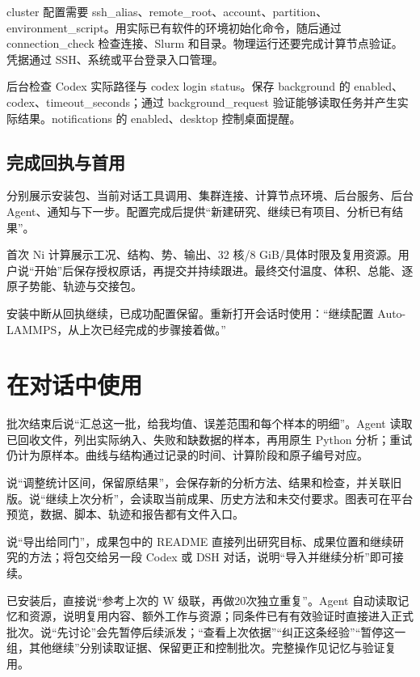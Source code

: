 \documentclass[11pt,a4paper]{ctexart}
\begin{document}
cluster 配置需要 ssh\_\allowbreak{}alias、remote\_\allowbreak{}root、account、partition、environment\_\allowbreak{}script。用实际已有软件的环境初始化命令，随后通过 connection\_\allowbreak{}check 检查连接、Slurm 和目录。物理运行还要完成计算节点验证。凭据通过 SSH、系统或平台登录入口管理。



后台检查 Codex 实际路径与 codex login status。保存 background 的 enabled、codex、timeout\_\allowbreak{}seconds；通过 background\_\allowbreak{}request 验证能够读取任务并产生实际结果。notifications 的 enabled、desktop 控制桌面提醒。



\subsection{完成回执与首用}


分别展示安装包、当前对话工具调用、集群连接、计算节点环境、后台服务、后台 Agent、通知与下一步。配置完成后提供“新建研究、继续已有项目、分析已有结果”。



首次 Ni 计算展示工况、结构、势、输出、32 核/\allowbreak{}8 GiB/\allowbreak{}具体时限及复用资源。用户说“开始”后保存授权原话，再提交并持续跟进。最终交付温度、体积、总能、逐原子势能、轨迹与交接包。



安装中断从回执继续，已成功配置保留。重新打开会话时使用：“继续配置 Auto-LAMMPS，从上次已经完成的步骤接着做。”

\clearpage
\section{在对话中使用}


批次结束后说“汇总这一批，给我均值、误差范围和每个样本的明细”。Agent 读取已回收文件，列出实际纳入、失败和缺数据的样本，再用原生 Python 分析；重试仍计为原样本。曲线与结构通过记录的时间、计算阶段和原子编号对应。



说“调整统计区间，保留原结果”，会保存新的分析方法、结果和检查，并关联旧版。说“继续上次分析”，会读取当前成果、历史方法和未交付要求。图表可在平台预览，数据、脚本、轨迹和报告都有文件入口。



说“导出给同门”，成果包中的 README 直接列出研究目标、成果位置和继续研究的方法；将包交给另一段 Codex 或 DSH 对话，说明“导入并继续分析”即可接续。



已安装后，直接说“参考上次的 W 级联，再做20次独立重复”。Agent 自动读取记忆和资源，说明复用内容、额外工作与资源；同条件已有有效验证时直接进入正式批次。说“先讨论”会先暂停后续派发；“查看上次依据”“纠正这条经验”“暂停这一组，其他继续”分别读取证据、保留更正和控制批次。完整操作见记忆与验证复用。
\end{document}
